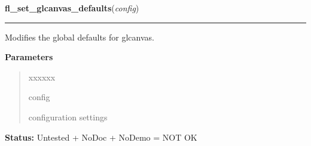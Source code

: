     \label{xformslib:library:fl_set_glcanvas_defaults}

    \vspace{0.5ex}

\hspace{.8\funcindent}\begin{boxedminipage}{\funcwidth}

    \raggedright \textbf{fl\_set\_glcanvas\_defaults}(\textit{config})

    \vspace{-1.5ex}

    \rule{\textwidth}{0.5\fboxrule}
\setlength{\parskip}{2ex}
    Modifies the global defaults for glcanvas.

\setlength{\parskip}{1ex}
      \textbf{Parameters}
      \vspace{-1ex}

      \begin{quote}
        \begin{Ventry}{xxxxxx}

          \item[config]

          configuration settings

        \end{Ventry}

      \end{quote}

\textbf{Status:} Untested + NoDoc + NoDemo = NOT OK



    \end{boxedminipage}

    \label{xformslib:library:fl_get_glcanvas_defaults}

    \vspace{0.5ex}

